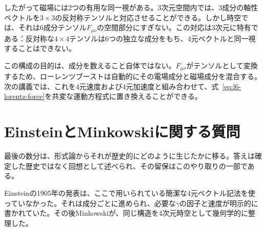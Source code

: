 したがって磁場には2つの有用な同一視がある。3次元空間内では、3成分の軸性ベクトルを\(3\times3\)の反対称テンソルと対応させることができる。しかし時空では、それは6成分テンソル\(F_{\mu\nu}\)の空間部分にすぎない。この対応は3次元に特有である：反対称な\(4\times4\)テンソルは6つの独立な成分をもち、4元ベクトルと同一視することはできない。

この構成の目的は、成分を数えること自体ではない。\(F_{\mu\nu}\)がテンソルとして変換するため、ローレンツブーストは自動的にその電場成分と磁場成分を混合する。次の講義では、これを4元速度および4元加速度と組み合わせて、式~\eqref{eq:l6-lorentz-force}を共変な運動方程式に置き換えることができる。

\section{EinsteinとMinkowskiに関する質問}

最後の数分は、形式論からそれが歴史的にどのように生じたかに移る。答えは確定した歴史ではなく回想として述べられ、その留保はこのやり取りの一部である。

\begin{classroomqa}
\end{classroomqa}

Einsteinの1905年の発表は、ここで用いられている簡潔な4元ベクトル記法を使っていなかった。それは成分ごとに進められ、必要な\(\gamma\)の因子と速度が明示的に書かれていた。その後Minkowskiが、同じ構造を4次元時空として幾何学的に整理した。

\begin{classroomqa}
\end{classroomqa}

